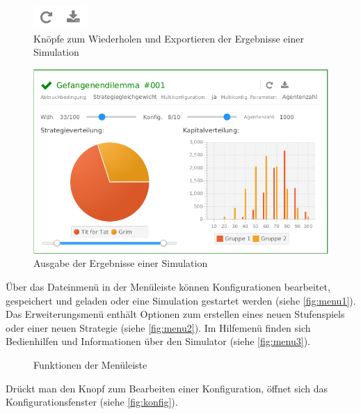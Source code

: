 \documentclass[parskip=full,11pt]{scrartcl}
\begin{document}
\begin{figure}[ht]
	\centering
	\includegraphics{images/out_btn.png}
	\caption{\label{fig:out_btn}
		Knöpfe zum Wiederholen und Exportieren der Ergebnisse einer Simulation}
\end{figure}
\begin{figure}[ht]
	\centering
	\includegraphics[width=\textwidth]{images/home_output.png}
	\caption{\label{fig:home_output}
		Ausgabe der Ergebnisse einer Simulation}
\end{figure}
\newpage
Über das Dateinmenü in der Menüleiste können Konfigurationen bearbeitet, gespeichert und geladen oder eine Simulation gestartet werden (siehe \cref{fig:menu1}).
Das Erweiterungsmenü enthält Optionen zum erstellen eines neuen Stufenspiels oder einer neuen Strategie (siehe \cref{fig:menu2}). Im Hilfemenü finden sich Bedienhilfen und Informationen über den Simulator (siehe \cref{fig:menu3}).

\begin{figure}[ht]
	\centering
	\qquad
	\qquad
	\caption{\label{fig:menu}
		Funktionen der Menüleiste
	}
\end{figure}
\newpage
Drückt man den Knopf zum Bearbeiten einer Konfiguration, öffnet sich das Konfigurationsfenster (siehe \cref{fig:konfig}).
\end{document}

